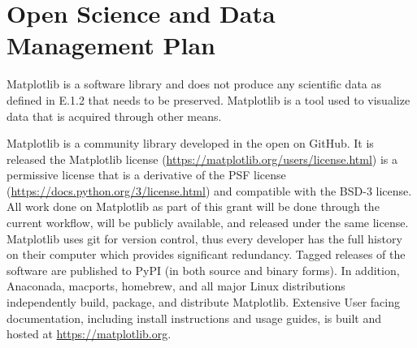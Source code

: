 \documentclass[12pt]{article}
\numberwithin{page}{section}
\begin{document}
\def\sovast{\ref@jnl{Soviet~Ast.}}      %
\def\ssr{\ref@jnl{Space~Sci.~Rev.}}     %
\def\zap{\ref@jnl{ZAp}}                 %
\def\nat{\ref@jnl{Nature}}              %
\def\iaucirc{\ref@jnl{IAU~Circ.}}       %
\def\aplett{\ref@jnl{Astrophys.~Lett.}} %
\def\apspr{\ref@jnl{Astrophys.~Space~Phys.~Res.}}
\def\bain{\ref@jnl{Bull.~Astron.~Inst.~Netherlands}}
\def\fcp{\ref@jnl{Fund.~Cosmic~Phys.}}  %
\def\gca{\ref@jnl{Geochim.~Cosmochim.~Acta}}   %
\def\grl{\ref@jnl{Geophys.~Res.~Lett.}} %
\def\jcp{\ref@jnl{J.~Chem.~Phys.}}      %
\def\jgr{\ref@jnl{J.~Geophys.~Res.}}    %
\def\jqsrt{\ref@jnl{J.~Quant.~Spec.~Radiat.~Transf.}}
\def\memsai{\ref@jnl{Mem.~Soc.~Astron.~Italiana}}
\def\nphysa{\ref@jnl{Nucl.~Phys.~A}}   %
\def\physrep{\ref@jnl{Phys.~Rep.}}   %
\def\physscr{\ref@jnl{Phys.~Scr}}   %
\def\planss{\ref@jnl{Planet.~Space~Sci.}}   %
\def\procspie{\ref@jnl{Proc.~SPIE}}   %

\let\astap=\aap
\let\apjlett=\apjl
\let\apjsupp=\apjs
\let\applopt=\ao
\setcounter{page}{1}


\newpage

\section{Open Science and Data Management Plan}
\setcounter{page}{1}

Matplotlib is a software library and does not produce any scientific
data as defined in E.1.2 that needs to be preserved.  Matplotlib is a
tool used to visualize data that is acquired through other means.

Matplotlib is a community library developed in the open on GitHub.
It is released the Matplotlib license
(\url{https://matplotlib.org/users/license.html}) is a permissive
license that is a derivative of the PSF license
(\url{https://docs.python.org/3/license.html}) and compatible with the
BSD-3 license.  All work done on Matplotlib as part of this grant will
be done through the current workflow, will be publicly available, and
released under the same license.  Matplotlib uses git for version
control, thus every developer has the full history on their computer
which provides significant redundancy.  Tagged releases of the
software are published to PyPI (in both source and binary forms).  In
addition, Anaconada, macports, homebrew, and all major Linux
distributions independently build, package, and distribute Matplotlib.
Extensive User facing documentation, including install instructions
and usage guides, is built and hosted at \url{https://matplotlib.org}.
\end{document}
